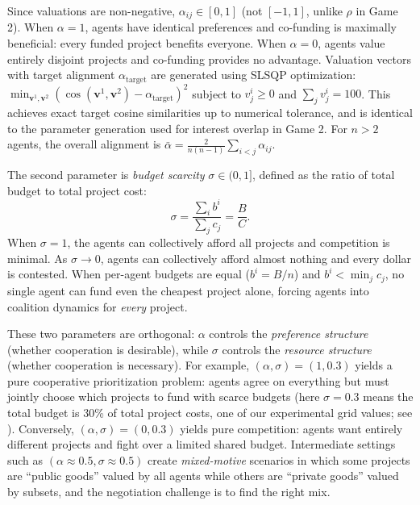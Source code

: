 Since valuations are non-negative, $\alpha_{ij} \in [0,1]$ (not $[-1,1]$, unlike $\rho$ in Game 2).
When $\alpha = 1$, agents have identical preferences and co-funding is maximally beneficial: every funded project benefits everyone.
When $\alpha = 0$, agents value entirely disjoint projects and co-funding provides no advantage.
Valuation vectors with target alignment $\alpha_{\text{target}}$ are generated using SLSQP optimization: $\min_{\bm{v}^1, \bm{v}^2} (\cos(\bm{v}^1, \bm{v}^2) - \alpha_{\text{target}})^2$ subject to $v^i_j \geq 0$ and $\sum_j v^i_j = 100$.
This achieves exact target cosine similarities up to numerical tolerance, and is identical to the parameter generation used for interest overlap in Game 2.
For $n > 2$ agents, the overall alignment is $\bar{\alpha} = \frac{2}{n(n-1)} \sum_{i < j} \alpha_{ij}$.

The second parameter is \emph{budget scarcity} $\sigma \in (0,1]$, defined as the ratio of total budget to total project cost:
\begin{equation}
    \sigma = \frac{\sum_{i} b^i}{\sum_{j} c_j} = \frac{B}{C}.
\end{equation}
When $\sigma = 1$, the agents can collectively afford all projects and competition is minimal.
As $\sigma \to 0$, agents can collectively afford almost nothing and every dollar is contested.
When per-agent budgets are equal ($b^i = B/n$) and $b^i < \min_j c_j$, no single agent can fund even the cheapest project alone, forcing agents into coalition dynamics for \emph{every} project.

These two parameters are orthogonal: $\alpha$ controls the \emph{preference structure} (whether cooperation is desirable), while $\sigma$ controls the \emph{resource structure} (whether cooperation is necessary).
For example, $(\alpha, \sigma) = (1, 0.3)$ yields a pure cooperative prioritization problem: agents agree on everything but must jointly choose which projects to fund with scarce budgets (here $\sigma = 0.3$ means the total budget is 30\% of total project costs, one of our experimental grid values; see ).
Conversely, $(\alpha, \sigma) = (0, 0.3)$ yields pure competition: agents want entirely different projects and fight over a limited shared budget.
Intermediate settings such as $(\alpha \approx 0.5, \sigma \approx 0.5)$ create \emph{mixed-motive} scenarios in which some projects are ``public goods'' valued by all agents while others are ``private goods'' valued by subsets, and the negotiation challenge is to find the right mix.

